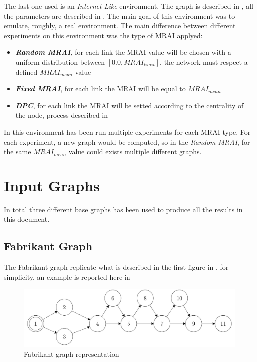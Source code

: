 \documentclass[10pt,conference,letterpaper]{IEEEtran}
\newcommand{\figwidth}{0.78}
\newcommand{\figvspace}{-1.5em}
\begin{document}
The last one used is an \textit{Internet Like} environment. 
The graph is described in , all the parameters are described in
.
The main goal of this environment was to emulate, roughly, a real environment.
The main difference between different experiments on this environment was the
type of \ac{MRAI} applyed:
\begin{itemize}
	\item \textit{\textbf{Random MRAI}}, for each link the \ac{MRAI} value will
		be chosen with a uniform distribution between $[0.0, MRAI_{limit}]$,
		the network must respect a defined $MRAI_{mean}$ value
	\item \textit{\textbf{Fixed MRAI}}, for each link the \ac{MRAI} will be 
		equal to $MRAI_{mean}$
	\item \textit{\textbf{DPC}}, for each link the \ac{MRAI} will be setted
		according to the centrality of the node, process described in 
\end{itemize}
In this environment has been run multiple experiments for each \ac{MRAI} type.
For each experiment, a new graph would be computed, so in the \textit{Random MRAI},
for the same $MRAI_{mean}$ value could exists multiple different graphs.

\section{Input Graphs}
\label{sec:graph}

In total three different base graphs has been used to produce all the results
in this document.

\subsection{Fabrikant Graph}
\label{subsec:fabrikant_graph}
The Fabrikant graph replicate what is described in the first figure in \cite{fabrikant}.
for simplicity, an example is reported here in 

\begin{figure}[tb]
	\centering
	\includegraphics[width=\figwidth\columnwidth]{images/fabrikant/graph.jpg}
	\caption{Fabrikant graph representation}
	\label{fig:fabr_graph}
	\vspace{\figvspace}
\end{figure}
\end{document}
